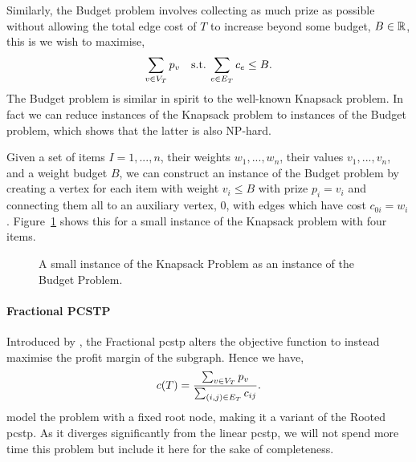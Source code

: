 Similarly, the Budget problem involves collecting as much prize as possible without allowing the
 total edge cost of $T$ to increase beyond some budget, $B \in \mathbb{R}$, this is we wish to maximise,
 \[\sum_{v \in V_T} p_v \quad \text{s.t.} \: \sum_{e \in E_T} c_e \leq B\mathnormal{.}\]
 The Budget problem is similar in spirit to the well-known Knapsack problem. In fact we can
 reduce instances of the Knapsack problem to instances of the Budget problem, which shows that
  the latter is also NP-hard.

 Given a set of items $I = 1,...,n$, their weights $w_1,...,w_n$, their values $v_1,...,v_n$, and
 a weight budget $B$, we
 can construct an instance of the Budget problem by creating a vertex for each item with weight
 $v_i \leq B$ with prize $p_i = v_i$ and connecting them all to an auxiliary vertex, $0$, with
 edges which have cost $c_{0i} = w_i$. Figure~\ref{fig:pcstp:budget:knapsack} shows this for
  a small instance of the Knapsack problem with four items.

 \begin{figure}[h!]\centering
{}
\caption{A small instance of the Knapsack Problem as an instance of the Budget Problem.}
\label{fig:pcstp:budget:knapsack}
\end{figure}

\paragraph{Fractional PCSTP}
Introduced by \citet{klau2003fractional}, the Fractional \gls{pcstp}
alters the objective function to instead maximise the profit
margin of the subgraph. Hence we have,
\[c(T) = \frac{\sum_{v \in V_T} p_v}{\sum_{(i,j) \in E_T} c_{ij}}\mathnormal{.}\]
\citet{klau2003fractional} model the problem with a fixed root node, making it a variant
of the Rooted \gls{pcstp}. As it diverges significantly from the linear \gls{pcstp},
we will not spend more time this problem but include it here for the sake of completeness.

